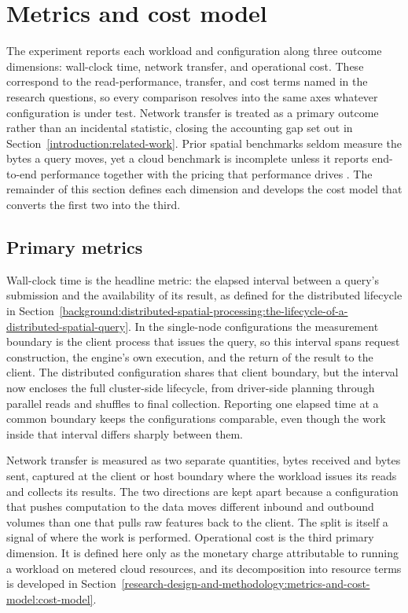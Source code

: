 \section{Metrics and cost model}
\label{research-design-and-methodology:metrics-and-cost-model}

The experiment reports each workload and configuration along three outcome dimensions: wall-clock time, network transfer, and operational cost. These correspond to the read-performance, transfer, and cost terms named in the research questions, so every comparison resolves into the same axes whatever configuration is under test. Network transfer is treated as a primary outcome rather than an incidental statistic, closing the accounting gap set out in Section~\ref{introduction:related-work}. Prior spatial benchmarks seldom measure the bytes a query moves, yet a cloud benchmark is incomplete unless it reports end-to-end performance together with the pricing that performance drives \parencite{folkerts2012_benchmarking_in_the_cloud}. The remainder of this section defines each dimension and develops the cost model that converts the first two into the third.

\subsection{Primary metrics}
\label{research-design-and-methodology:metrics-and-cost-model:primary-metrics}

Wall-clock time is the headline metric: the elapsed interval between a query's submission and the availability of its result, as defined for the distributed lifecycle in Section~\ref{background:distributed-spatial-processing:the-lifecycle-of-a-distributed-spatial-query}. In the single-node configurations the measurement boundary is the client process that issues the query, so this interval spans request construction, the engine's own execution, and the return of the result to the client. The distributed configuration shares that client boundary, but the interval now encloses the full cluster-side lifecycle, from driver-side planning through parallel reads and shuffles to final collection. Reporting one elapsed time at a common boundary keeps the configurations comparable, even though the work inside that interval differs sharply between them.

Network transfer is measured as two separate quantities, bytes received and bytes sent, captured at the client or host boundary where the workload issues its reads and collects its results. The two directions are kept apart because a configuration that pushes computation to the data moves different inbound and outbound volumes than one that pulls raw features back to the client. The split is itself a signal of where the work is performed. Operational cost is the third primary dimension. It is defined here only as the monetary charge attributable to running a workload on metered cloud resources, and its decomposition into resource terms is developed in Section~\ref{research-design-and-methodology:metrics-and-cost-model:cost-model}.

